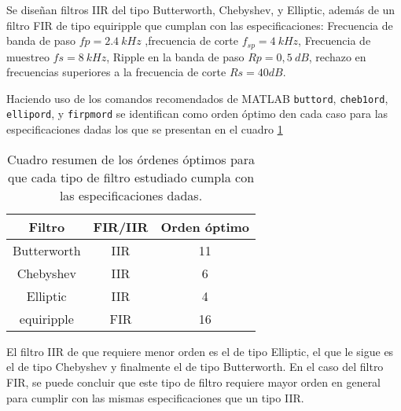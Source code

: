 Se diseñan  filtros  IIR del tipo Butterworth, Chebyshev, y Elliptic, además de un filtro FIR de tipo equiripple que cumplan con las especificaciones: Frecuencia de banda de paso $fp = 2.4~kHz$ ,frecuencia de corte $f_{sp} = 4~kHz$, Frecuencia de muestreo $fs = 8~kHz$, Ripple en la banda de paso $Rp = 0,5~dB$, rechazo   en frecuencias superiores a la frecuencia de corte $  Rs = 40dB$.

Haciendo uso de los comandos recomendados de MATLAB \texttt{buttord}, \texttt{cheb1ord}, \texttt{ellipord}, y \texttt{firpmord} se identifican como orden óptimo den cada caso para las especificaciones dadas los que se presentan en el cuadro \ref{ordenes}


 \begin{table}[H]
        \centering
        \begin{tabular}{|c|c|c|}
        \hline
         Filtro    & FIR/IIR & Orden óptimo \\
         \hline
         Butterworth  &  IIR  & 11 \\
         \hline
         Chebyshev  & IIR & 6  	 \\
         \hline
         Elliptic &   IIR &  4 \\
         \hline
        
         equiripple  & FIR &  16  \\
         \hline


        \end{tabular}
        \caption{Cuadro resumen de los órdenes óptimos para que cada tipo de filtro estudiado cumpla con las especificaciones dadas.}
        \label{ordenes}
    \end{table}
    
    El filtro IIR de que requiere menor orden es el de tipo Elliptic, el que le sigue es el de tipo Chebyshev y finalmente el de tipo Butterworth. En el caso del filtro FIR, se puede concluir que este tipo de filtro requiere mayor orden en general para cumplir con las mismas especificaciones que un tipo IIR.
    
    
    